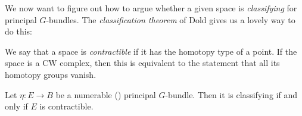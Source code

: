 \documentclass[11pt]{amsart}
\begin{document}
We now want to figure out how to argue whether a given space is \emph{classifying} for principal $G$-bundles. The \emph{classification theorem} of Dold gives us a lovely way to do this:

\begin{definition}\label{def:contractible} We say that a space is \emph{contractible} if it has the homotopy type of a point. If the space is a CW complex, then this is equivalent to the statement that all its homotopy groups vanish.
\end{definition}

\begin{theorem}
\label{thm:classification-thm-principal-G-bundles}
Let $\eta \colon E \to B$ be a numerable () principal $G$-bundle. Then it is classifying if and only if $E$ is contractible.
\end{theorem}
\end{document}
